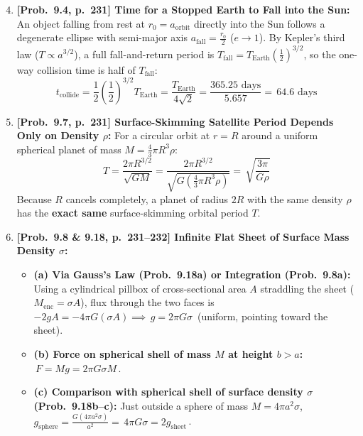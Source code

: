 \documentclass[11pt,a4paper,openany,oneside]{book}
\newcommand{\eqbox}[1]{\boxed{\,#1\,}}
\numberwithin{equation}{chapter}
\begin{document}
\begin{enumerate}[label=\textbf{Prob.\ 9.\arabic*},leftmargin=4.2em]
  \setcounter{enumi}{3}
  \item \textbf{[Prob.\ 9.4, p.\ 231] Time for a Stopped Earth to Fall into the Sun:}
  An object falling from rest at $r_0 = a_{\text{orbit}}$ directly into the Sun follows a degenerate ellipse with semi-major axis $a_{\text{fall}} = \frac{r_0}{2}$ ($e\to 1$). By Kepler's third law ($T \propto a^{3/2}$), a full fall-and-return period is $T_{\text{fall}} = T_{\text{Earth}}\!\left(\frac{1}{2}\right)^{3/2}$, so the one-way collision time is half of $T_{\text{fall}}$:
  \begin{equation*}
    t_{\text{collide}} = \frac{1}{2}\!\left(\frac{1}{2}\right)^{3/2} T_{\text{Earth}} = \frac{T_{\text{Earth}}}{4\sqrt{2}} = \frac{365.25\text{ days}}{5.657} = \eqbox{64.6\text{ days}}
  \end{equation*}

  \setcounter{enumi}{6}
  \item \textbf{[Prob.\ 9.7, p.\ 231] Surface-Skimming Satellite Period Depends Only on Density $\rho$:}
  For a circular orbit at $r = R$ around a uniform spherical planet of mass $M = \frac{4}{3}\pi R^3\rho$:
  \begin{equation*}
    T = \frac{2\pi R^{3/2}}{\sqrt{GM}} = \frac{2\pi R^{3/2}}{\sqrt{G\!\left(\frac{4}{3}\pi R^3\rho\right)}} = \eqbox{\sqrt{\frac{3\pi}{G\rho}}}
  \end{equation*}
  Because $R$ cancels completely, a planet of radius $2R$ with the same density $\rho$ has the \textbf{exact same} surface-skimming orbital period $T$.

  \item \textbf{[Prob.\ 9.8 \& 9.18, p.\ 231--232] Infinite Flat Sheet of Surface Mass Density $\sigma$:}
  \begin{itemize}
    \item \textbf{(a) Via Gauss's Law (Prob.\ 9.18a) or Integration (Prob.\ 9.8a):} Using a cylindrical pillbox of cross-sectional area $A$ straddling the sheet ($M_{\text{enc}} = \sigma A$), flux through the two faces is $-2gA = -4\pi G(\sigma A) \implies \eqbox{g = 2\pi G\sigma}$ (uniform, pointing toward the sheet).
    \item \textbf{(b) Force on spherical shell of mass $M$ at height $b > a$:} $\eqbox{F = Mg = 2\pi G\sigma M}$.
    \item \textbf{(c) Comparison with spherical shell of surface density $\sigma$ (Prob.\ 9.18b--c):} Just outside a sphere of mass $M = 4\pi a^2\sigma$, $g_{\text{sphere}} = \frac{G(4\pi a^2\sigma)}{a^2} = \eqbox{4\pi G\sigma = 2g_{\text{sheet}}}$.
  \end{itemize}


\end{enumerate}
\end{document}
